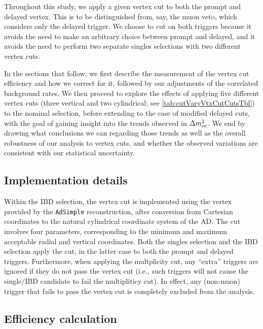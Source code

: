 \documentclass[../thesis.tex]{subfiles}
\begin{document}
Throughout this study, we apply a given vertex cut to both the prompt and delayed vertex. This is to be distinguished from, say, the muon veto, which considers only the delayed trigger. We choose to cut on both triggers because it avoids the need to make an arbitrary choice between prompt and delayed, and it avoids the need to perform two separate singles selections with two different vertex cuts.

In the sections that follow, we first describe the measurement of the vertex cut efficiency and how we correct for it, followed by our adjustments of the correlated background rates. We then proceed to explore the effects of applying five different vertex cuts (three vertical and two cylindrical; see \autoref{tab:cutVaryVtxCutCutsTbl}) to the nominal selection, before extending to the case of modified delayed cuts, with the goal of gaining insight into the trends observed in $\Delta m^2_{ee}$. We end by drawing what conclusions we can regarding those trends as well as the overall robustness of our analysis to vertex cuts, and whether the observed variations are consistent with our statistical uncertainty.

\subsection{Implementation details}
\label{sec:cutVaryVtxCutImplDet}

Within the IBD selection, the vertex cut is implemented using the vertex provided by the \texttt{AdSimple} reconstruction, after conversion from Cartesian coordinates to the natural cylindrical coordinate system of the AD. The cut involves four parameters, corresponding to the minimum and maximum acceptable radial and vertical coordinates. Both the singles selection and the IBD selection apply the cut, in the latter case to both the prompt and delayed triggers. Furthermore, when applying the multplicity cut, any ``extra'' triggers are ignored if they do not pass the vertex cut (i.e., such triggers will not cause the single/IBD candidate to fail the multipliticy cut). In effect, any (non-muon) trigger that fails to pass the vertex cut is completely excluded from the analysis.

\subsection{Efficiency calculation}
\label{sec:cutVaryVtxCutEffCalc}
\end{document}
